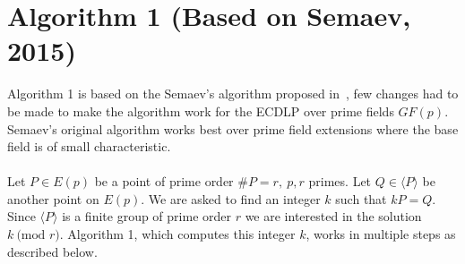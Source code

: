 \documentclass[thesis=M,english]{FITthesis}[2012/10/20]
\theoremstyle{remark}
\theoremstyle{definition}
\begin{document}
\section{Algorithm 1 (Based on Semaev, 2015)} \label{alg1}
Algorithm 1 is based on the Semaev's algorithm proposed in~\cite{semaev15}, few changes had to be made to make the algorithm work for the ECDLP over prime fields $GF(p)$. Semaev's original algorithm works best over prime field extensions where the base field is of small characteristic.  \\ \\
\noindent Let $P \in E(p)$ be a point of prime order $\#P = r,\ p,r$ primes. Let $Q \in \langle P \rangle$ be another point on $E(p)$. We are asked to find an integer $k$ such that $kP = Q.$ Since $\langle P \rangle$ is a finite group of prime order $r$ we are interested in the solution $k\ \text{(mod }r)$. Algorithm 1, which computes this integer $k$, works in multiple steps as described below.
\end{document}
